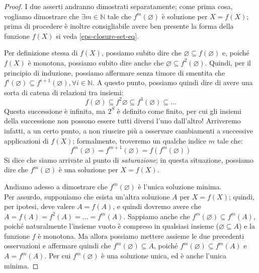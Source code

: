 \documentclass[class=book, crop=false, oneside, 12pt]{standalone}
\begin{document}
\begin{proof}
    I due asserti andranno dimostrati separatamente; come prima cosa, vogliamo dimostrare che \(\exists m \in \mathbb{N}\) tale che \(f^m(\varnothing)\) è soluzione per \(X = f(X)\); prima di procedere è inoltre consigliabile avere ben presente la forma della funzione \(f(X)\) si veda \ref{eps-closure-set-eq}.

    Per definizione stessa di \(f(X)\), possiamo subito dire che \(\varnothing \subseteq f(\varnothing)\) e, poiché \(f(X)\) è monotona, possiamo subito dire anche che \(\varnothing \subseteq f^2(\varnothing)\). Quindi, per il principio di induzione, possiamo affermare senza timore di smentita che \(f^i(\varnothing) \subseteq f^{i + 1}(\varnothing), \forall i \in \mathbb{N} \). A questo punto, possiamo quindi dire di avere una sorta di catena di relazioni tra insiemi:
    \begin{equation*}
        f(\varnothing) \subseteq f^2{\varnothing} \subseteq f^3(\varnothing) \subseteq \ldots
    \end{equation*}
    Questa successione è infinita, ma \(2^S\) è definito come finito, per cui gli insiemi della successione non possono essere tutti diversi l'uno dall'altro! Arriveremo infatti, a un certo punto, a non riuscire più a osservare cambiamenti a successive applicazioni di \(f(X)\); formalmente, troveremo un qualche indice \(m\) tale che:
    \begin{equation*}
        f^m(\varnothing) = f^{m + 1} (\varnothing) = f(f^m(\varnothing))
    \end{equation*}
    Si dice che siamo arrivate al punto di \emph{saturazione}; in questa situazione, possiamo dire che \(f^m(\varnothing)\) è una soluzione per \(X = f(X)\).

    Andiamo adesso a dimostrare che \(f^m(\varnothing)\) è l'unica soluzione minima.\\
    Per assurdo, supponiamo che esista un'altra soluzione \(A\) per \(X = f(X)\); quindi, per ipotesi, deve valere \(A = f(A)\), e quindi dovremo avere che \(A = f(A) = f^2(A) = \ldots = f^m(A)\). Sappiamo anche che \(f^m(\varnothing) \subseteq f^m(A)\), poiché naturalmente l'insieme vuoto è compreso in qualsiasi insieme (\(\varnothing \subseteq A\)) e la funzione \(f\) è monotona. Ma allora possiamo mettere assieme le due precedenti osservazioni e affermare quindi che \(f^m(\varnothing) \subseteq A\), poiché \(f^m(\varnothing) \subseteq f^m(A)\) e \(A = f^m(A)\). Per cui \(f^m(\varnothing)\) è una soluzione unica, ed è anche l'unica minima. 

\end{proof}
\end{document}
